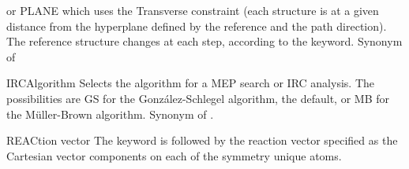 \begin{keywordlist}
or PLANE which uses the Transverse constraint (each structure is at a given distance from the hyperplane defined by the reference and the path direction).
The reference structure changes at each step, according to the  keyword.
Synonym of 
\item[IRCAlgorithm]
Selects the algorithm for a MEP search or IRC analysis.
The possibilities are GS for the Gonz\'alez-Schlegel algorithm, the default, or MB for the M\"uller-Brown algorithm.
Synonym of .
\item[REACtion vector]
The keyword is followed by the reaction vector specified as the Cartesian vector components
on each of the symmetry unique atoms.
\end{keywordlist}

